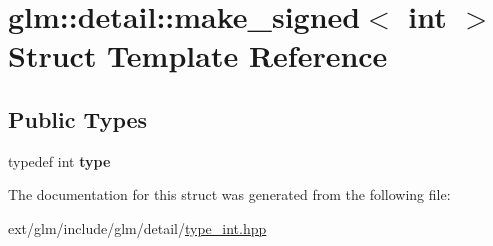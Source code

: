\hypertarget{structglm_1_1detail_1_1make__signed_3_01int_01_4}{\section{glm\-:\-:detail\-:\-:make\-\_\-signed$<$ int $>$ Struct Template Reference}
\label{structglm_1_1detail_1_1make__signed_3_01int_01_4}
}
\subsection*{Public Types}
\begin{DoxyCompactItemize}
\item 
\hypertarget{structglm_1_1detail_1_1make__signed_3_01int_01_4_a69085e97a5044d1985cdc2116eb6ea9b}{typedef int {\bfseries type}}\label{structglm_1_1detail_1_1make__signed_3_01int_01_4_a69085e97a5044d1985cdc2116eb6ea9b}

\end{DoxyCompactItemize}


The documentation for this struct was generated from the following file\-:\begin{DoxyCompactItemize}
\item 
ext/glm/include/glm/detail/\hyperlink{type__int_8hpp}{type\-\_\-int.\-hpp}\end{DoxyCompactItemize}
